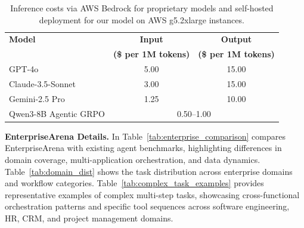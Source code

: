 \documentclass{article}
\theoremstyle{plain}
\theoremstyle{definition}
\theoremstyle{remark}
\begin{document}


\begin{table}[H]
\centering
\small
\begin{tabular}{l|cc}
\toprule
\textbf{Model} & \textbf{Input} & \textbf{Output} \\
& \textbf{(\$ per 1M tokens)} & \textbf{(\$ per 1M tokens)} \\
\midrule
GPT-4o & 5.00 & 15.00 \\
Claude-3.5-Sonnet & 3.00 & 15.00 \\
Gemini-2.5 Pro & 1.25 & 10.00 \\
\midrule
Qwen3-8B Agentic GRPO & \multicolumn{2}{c}{0.50--1.00} \\
\bottomrule
\end{tabular}
\caption{Inference costs via AWS Bedrock for proprietary models and self-hosted deployment for our model on AWS g5.2xlarge instances.}
\label{tab:cost_appendix}
\end{table}



\textbf{EnterpriseArena Details.} 
In Table~\ref{tab:enterprise_comparison} compares EnterpriseArena with existing agent benchmarks, highlighting differences in domain coverage, multi-application orchestration, and data dynamics. Table~\ref{tab:domain_dist} shows the task distribution across enterprise domains and workflow categories. Table~\ref{tab:complex_task_examples} provides representative examples of complex multi-step tasks, showcasing cross-functional orchestration patterns and specific tool sequences across software engineering, HR, CRM, and project management domains.
\end{document}
